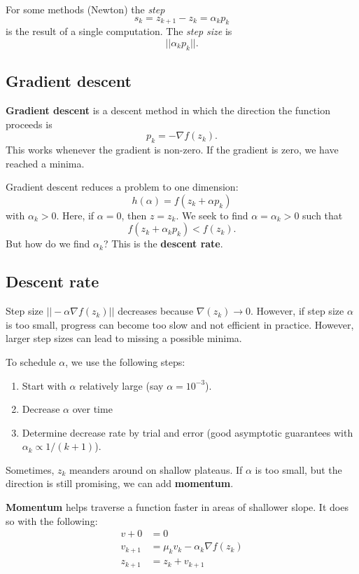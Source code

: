 \documentclass[titlepage, 12pt, leqno]{article}
\begin{document}
For some methods (Newton) the \textit{step}
\[
    s_{k} = z_{k+1} - z_{k} = \alpha_{k}p_{k}
\]
is the result of a single computation. The \textit{step size} is 
\[
    ||\alpha_{k}p_{k}||.
\]

\subsection{Gradient descent}

\begin{definition}
    \textbf{Gradient descent} is a descent method in which the direction the 
    function proceeds is
    \[
        p_{k} = -\nabla f(z_{k}).
    \]
    This works whenever the gradient is non-zero. If the gradient is zero, we
    have reached a minima.
\end{definition}

Gradient descent reduces a problem to one dimension:
\[
h(\alpha) = f(z_{k} + \alpha p_{k}) 
\]
with $\alpha_{k}>0$. Here, if $\alpha = 0$, then $z = z_{k}$. We seek to find
$\alpha = \alpha_{k} > 0$ such that
\[
    f(z_{k} + \alpha_{k}p_{k}) < f(z_{k}).
\]
But how do we find $\alpha_{k}$? This is the \textbf{descent rate}.

\subsection{Descent rate}
Step size $||-\alpha\nabla f(z_{k})||$ decreases because $\nabla(z_{k})
\rightarrow 0$. However, if step size $\alpha$ is too small, progress can 
become too slow and not efficient in practice. However, larger step sizes can lead
to missing a possible minima.

To schedule $\alpha$, we use the following steps:
\begin{enumerate}
    \item Start with $\alpha$ relatively large (say $\alpha = 10^{-3}$).
    \item Decrease $\alpha$ over time
    \item Determine decrease rate by trial and error (good asymptotic guarantees
        with $\alpha_{k}\propto 1/(k+1)$).
\end{enumerate}

Sometimes, $z_{k}$ meanders around on shallow plateaus. If $\alpha$ is too small,
but the direction is still promising, we can add \textbf{momentum}.
\begin{definition}
    \textbf{Momentum} helps traverse a function faster in areas of shallower
    slope. It does so with the following:
    \begin{align*}
        v+0 &= 0\\
        v_{k+1} &= \mu_{k}v_{k} - \alpha_{k}\nabla f(z_{k})\\
        z_{k+1} &= z_{k} + v_{k+1}
    \end{align*}
\end{definition}
\end{document}
